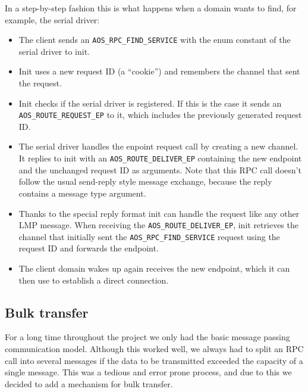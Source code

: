 \documentclass[a4paper,10pt]{article}
\begin{document}
In a step-by-step fashion this is what happens when a domain wants to find, for example, the serial driver:

\begin{itemize}
 \item The client sends an \lstinline!AOS_RPC_FIND_SERVICE! with the enum constant of the serial driver to init.
 \item Init uses a new request ID (a ``cookie'') and remembers the channel that sent the request.
 \item Init checks if the serial driver is registered. 
 If this is the case it sends an \lstinline!AOS_ROUTE_REQUEST_EP! to it, which includes the previously generated request ID.
 \item The serial driver handles the enpoint request call by creating a new channel.
 It replies to init with an \lstinline!AOS_ROUTE_DELIVER_EP! containing the new endpoint and the unchanged request ID as arguments.
 Note that this RPC call doesn't follow the usual send-reply style message exchange, because the reply contains a message type argument.
 \item Thanks to the special reply format init can handle the request like any other LMP message.
 When receiving the \lstinline!AOS_ROUTE_DELIVER_EP!, init retrieves the channel that initially sent the \lstinline!AOS_RPC_FIND_SERVICE! request using the request ID and forwards the endpoint.
 \item The client domain wakes up again receives the new endpoint, which it can then use to establish a direct connection.
\end{itemize}




\subsection{Bulk transfer}

For a long time throughout the project we only had the basic message passing communication model.
Although this worked well, we always had to split an RPC call into several messages if the data to be transmitted exceeded the capacity of a single message.
This was a tedious and error prone process, and due to this we decided to add a mechanism for bulk transfer.
\end{document}
